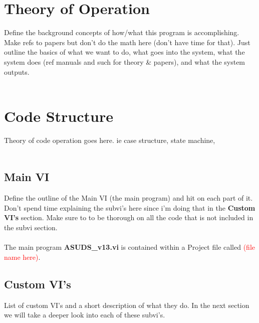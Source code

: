 \documentclass[letterpaper, twoside, openright]{report}
\begin{document}
\cite{gomez_alvarez-arenas_air-coupled_2003}

\chapter{Theory of Operation}

Define the background concepts of how/what this program is accomplishing.  Make refs to papers but don't do the math here (don't have time for that).  Just outline the basics of what we want to do, what goes into the system, what the system does (ref manuals and such for theory \& papers), and what the system outputs.
\\ \\

\chapter{Code Structure}

Theory of code operation goes here. ie case structure, state machine, 
\\ \\
\section{Main VI}

Define the outline of the Main VI (the main program) and hit on each part of it.  Don't spend time explaining the subvi's here since i'm doing that in the \textbf{Custom VI's} section. Make sure to to be thorough on all the code that is not included in the subvi section.
\\ \\
The main program \textbf{ASUDS\_v13.vi} is contained within a Project file called \textcolor{red}{(file name here)}.

\section{Custom VI's}

List of custom VI's and a short description of what they do. In the next section we will take a deeper look into each of these subvi's.
\end{document}
